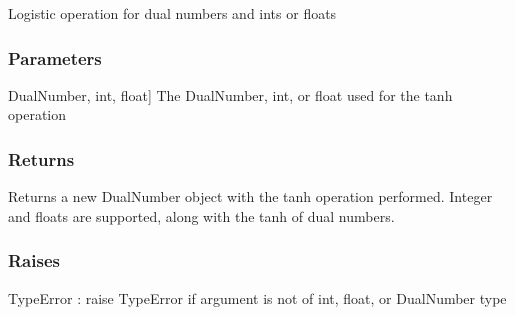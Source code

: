\documentclass[letterpaper,10pt,english]{sphinxmanual}
\begin{document}
\begin{fulllineitems}
\label{\detokenize{autodiff:autodiff.operators.logistic}}
\pysigstartsignatures
{}
\pysigstopsignatures
\sphinxAtStartPar
Logistic operation for dual numbers and ints or floats


\subsubsection{Parameters}
\label{\detokenize{autodiff:id30}}\begin{description}
\sphinxlineitem{x}{[}DualNumber, int, float{]}
\sphinxAtStartPar
The DualNumber, int, or float used for the tanh operation

\end{description}


\subsubsection{Returns}
\label{\detokenize{autodiff:id31}}\begin{description}
\sphinxAtStartPar
Returns a new DualNumber object with the tanh operation performed. Integer and
floats are supported, along with the tanh of dual numbers.

\end{description}


\subsubsection{Raises}
\label{\detokenize{autodiff:id32}}
\sphinxAtStartPar
TypeError : raise TypeError if argument is not of int, float, or DualNumber type

\end{fulllineitems}

\end{document}
